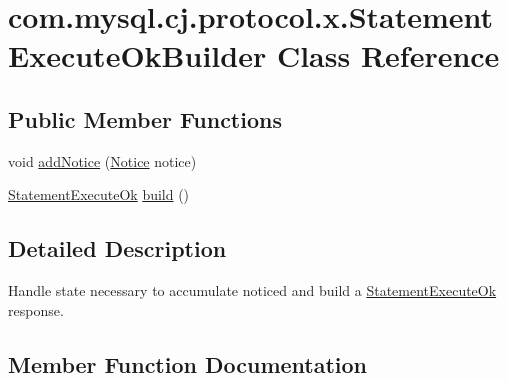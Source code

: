 \hypertarget{classcom_1_1mysql_1_1cj_1_1protocol_1_1x_1_1_statement_execute_ok_builder}{}\section{com.\+mysql.\+cj.\+protocol.\+x.\+Statement\+Execute\+Ok\+Builder Class Reference}
\label{classcom_1_1mysql_1_1cj_1_1protocol_1_1x_1_1_statement_execute_ok_builder}
\subsection*{Public Member Functions}
\begin{DoxyCompactItemize}
\item 
void \mbox{\hyperlink{classcom_1_1mysql_1_1cj_1_1protocol_1_1x_1_1_statement_execute_ok_builder_a5605d2cf927622739cdd15b9b4ac9f58}{add\+Notice}} (\mbox{\hyperlink{classcom_1_1mysql_1_1cj_1_1protocol_1_1x_1_1_notice}{Notice}} notice)
\item 
\mbox{\hyperlink{classcom_1_1mysql_1_1cj_1_1protocol_1_1x_1_1_statement_execute_ok}{Statement\+Execute\+Ok}} \mbox{\hyperlink{classcom_1_1mysql_1_1cj_1_1protocol_1_1x_1_1_statement_execute_ok_builder_ab26041f70ee82ba7709d193a5ec1db2f}{build}} ()
\end{DoxyCompactItemize}


\subsection{Detailed Description}
Handle state necessary to accumulate noticed and build a \mbox{\hyperlink{classcom_1_1mysql_1_1cj_1_1protocol_1_1x_1_1_statement_execute_ok}{Statement\+Execute\+Ok}} response. 

\subsection{Member Function Documentation}
\mbox{\label{classcom_1_1mysql_1_1cj_1_1protocol_1_1x_1_1_statement_execute_ok_builder_a5605d2cf927622739cdd15b9b4ac9f58}} 
